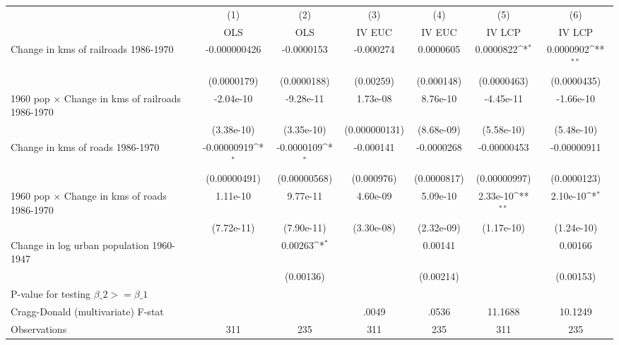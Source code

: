 {
\def\sym#1{\ifmmode^{#1}\else\(^{#1}\)\fi}
\begin{tabular}{l*{6}{c}}
\hline\hline
                &\multicolumn{1}{c}{(1)}&\multicolumn{1}{c}{(2)}&\multicolumn{1}{c}{(3)}&\multicolumn{1}{c}{(4)}&\multicolumn{1}{c}{(5)}&\multicolumn{1}{c}{(6)}\\
                &\multicolumn{1}{c}{OLS}&\multicolumn{1}{c}{OLS}&\multicolumn{1}{c}{IV EUC}&\multicolumn{1}{c}{IV EUC}&\multicolumn{1}{c}{IV LCP}&\multicolumn{1}{c}{IV LCP}\\
\hline
Change in kms of railroads 1986-1970&-0.000000426         &-0.0000153         &-0.000274         &0.0000605         &0.0000822\sym{*}  &0.0000902\sym{**} \\
                &(0.0000179)         &(0.0000188)         &(0.00259)         &(0.000148)         &(0.0000463)         &(0.0000435)         \\
[1em]
1960 pop $\times$ Change in kms of railroads 1986-1970&-2.04e-10         &-9.28e-11         & 1.73e-08         & 8.76e-10         &-4.45e-11         &-1.66e-10         \\
                &(3.38e-10)         &(3.35e-10)         &(0.000000131)         &(8.68e-09)         &(5.58e-10)         &(5.48e-10)         \\
[1em]
Change in kms of roads 1986-1970&-0.00000919\sym{*}  &-0.0000109\sym{*}  &-0.000141         &-0.0000268         &-0.00000453         &-0.00000911         \\
                &(0.00000491)         &(0.00000568)         &(0.000976)         &(0.0000817)         &(0.00000997)         &(0.0000123)         \\
[1em]
1960 pop $\times$ Change in kms of roads 1986-1970& 1.11e-10         & 9.77e-11         & 4.60e-09         & 5.09e-10         & 2.33e-10\sym{**} & 2.10e-10\sym{*}  \\
                &(7.72e-11)         &(7.90e-11)         &(3.30e-08)         &(2.32e-09)         &(1.17e-10)         &(1.24e-10)         \\
[1em]
Change in log urban population 1960-1947&                  &  0.00263\sym{*}  &                  &  0.00141         &                  &  0.00166         \\
                &                  &(0.00136)         &                  &(0.00214)         &                  &(0.00153)         \\
\hline
P-value for testing $\beta\_{2} >= \beta\_{1}$&                  &                  &                  &                  &                  &                  \\
Cragg-Donald (multivariate) F-stat&                  &                  &    .0049         &    .0536         &  11.1688         &  10.1249         \\
Observations    &      311         &      235         &      311         &      235         &      311         &      235         \\
\hline\hline
\end{tabular}
}
